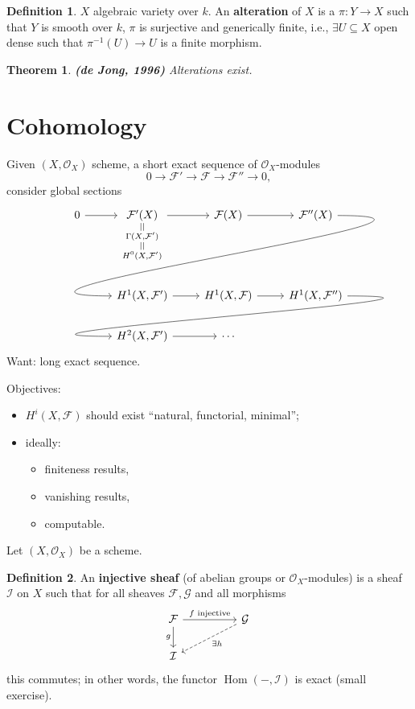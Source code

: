 \documentclass[12pt]{article}
\DeclareMathOperator{\Hom}{Hom}
\newtheorem*{theorem}{Theorem}
\theoremstyle{definition}
\newtheorem*{definition}{Definition}
\begin{document}
\begin{definition}
$X$ algebraic variety over $k$. An \textbf{alteration} of $X$ is a $\pi:Y\rightarrow X$ such that $Y$ is smooth over $k$, $\pi$ is surjective and generically finite, i.e., $\exists U\subseteq X$ open dense such that $\pi^{-1}(U)\rightarrow U$ is a finite morphism.
\end{definition}

\begin{theorem}
\emph{\textbf{(de Jong, 1996)}} Alterations exist.
\end{theorem}

\section{Cohomology}
Given $(X,\mathcal{O}_X)$ scheme, a short exact sequence of $\mathcal{O}_X$-modules
\[0\longrightarrow\mathcal{F}'\longrightarrow\mathcal{F}\longrightarrow\mathcal{F}''\longrightarrow0,\]
consider global sections
\[
\begin{tikzcd}
0\arrow[r]&\underset{\substack{||\\\Gamma(X,\mathcal{F}')\\||\\H^0(X,\mathcal{F}')}}{\mathcal{F}'(X)}\arrow[r]&\mathcal{F}(X)\arrow[r]&\mathcal{F}''(X)\arrow[out=0,in=180,looseness=2,overlay,lld]\\
&H^1(X,\mathcal{F}')\arrow[r]&H^1(X,\mathcal{F})\arrow[r]&H^1(X,\mathcal{F}'')\arrow[out=0,in=180, looseness=2,overlay,lld]\\
&H^2(X,\mathcal{F}')\arrow[r]&\cdots
\end{tikzcd}
\]
Want: long exact sequence.

Objectives:
\begin{itemize}[label=$-$]
\item $H^i(X,\mathcal{F})$ should exist ``natural, functorial, minimal'';
\item ideally:
\begin{itemize}[label=$-$]
\item finiteness results,
\item vanishing results,
\item computable.
\end{itemize}
\end{itemize}

Let $(X,\mathcal{O}_X)$ be a scheme.

\begin{definition}
An \textbf{injective sheaf} (of abelian groups or $\mathcal{O}_X$-modules) is a sheaf $\mathcal{I}$ on $X$ such that for all sheaves $\mathcal{F},\mathcal{G}$ and all morphisms
\[
\begin{tikzcd}
\mathcal{F}\arrow[rr,"f\text{ injective}"]\arrow[d,"g",swap]&&\mathcal{G}\arrow[lld,dashed,"\exists h"]\\
\mathcal{I}
\end{tikzcd}
\]
this commutes; in other words, the functor $\Hom(-,\mathcal{I})$ is exact (small exercise).
\end{definition}
\end{document}
